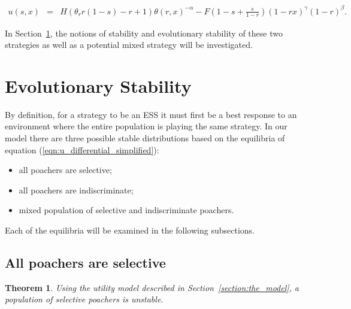 \documentclass[10pt]{article}
\newtheorem{theorem}{Theorem}
\begin{document}
\begin{eqnarray}
\label{eqn:tutility2}
u(s, x) &=&
H (\theta_r r(1-s) - r + 1)\theta(r,x)^{-\alpha} - F\left(1-s + \frac{s}{1-r} \right)(1-rx)^{\gamma}(1-r)^{\beta} .
\end{eqnarray}

In Section~\ref{section:evolutionary_stability}, the notions of stability
and evolutionary stability of these two strategies as well as a potential
mixed strategy will be investigated.

\section{Evolutionary Stability}\label{section:evolutionary_stability}

By definition, for a strategy to be an ESS it must first be a best response to an
environment where the entire population is playing the same strategy.
In our model there are three possible stable distributions based on the
equilibria of equation (\ref{eqn:u_differential_simplified}):

\begin{itemize} 
    \item all poachers are selective;
    \item all poachers are indiscriminate;
    \item mixed population of selective and indiscriminate poachers.
\end{itemize}

Each of the equilibria will be examined in the following subsections.

\subsection{All poachers are selective}

\begin{theorem}\label{theorem:selective}
Using the utility model described in Section~\ref{section:the_model},
a population of selective poachers is unstable.
\end{theorem}
\end{document}
